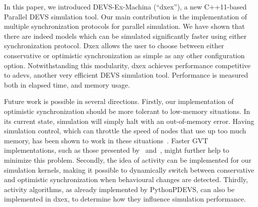 In this paper, we introduced DEVS-Ex-Machina (``dxex''), a new C++11-based \textsf{Parallel DEVS} simulation tool.
Our main contribution is the implementation of multiple synchronization protocols for parallel simulation.
We have shown that there are indeed models which can be simulated significantly faster using either synchronization protocol.
Dxex allows the user to choose between either conservative or optimistic synchronization as simple as any other configuration option.
Notwithstanding this modularity, dxex achieves performance competitive to adevs, another very efficient \textsf{DEVS} simulation tool.
Performance is measured both in elapsed time, and memory usage.

Future work is possible in several directions.
Firstly, our implementation of optimistic synchronization should be more tolerant to low-memory situations.
In its current state, simulation will simply halt with an out-of-memory error.
Having simulation control, which can throttle the speed of nodes that use up too much memory, has been shown to work in these situations~\cite{FujimotoBook}.
Faster GVT implementations, such as those presented by~\cite{Fujimoto:1997:CGV:268403.268404} and~\cite{Bauer:2005:SND:1069810.1070159}, might further help to minimize this problem.
Secondly, the idea of activity can be implemented for our simulation kernels, making it possible to dynamically switch between conservative and optimistic synchronization when behavioural changes are detected.
Thirdly, activity algorithms, as already implemented by PythonPDEVS, can also be implemented in dxex, to determine how they influence simulation performance.
